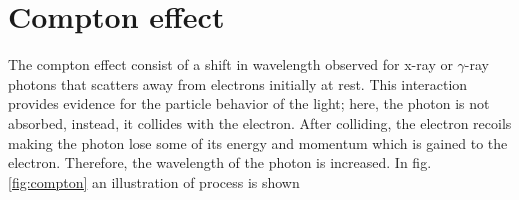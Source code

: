 \documentclass{article}
\begin{document}
\section{Compton effect}
The compton effect consist of a shift in wavelength observed for x-ray or $\gamma$-ray photons that scatters away from electrons initially at rest. This interaction provides evidence for the particle behavior of the light; here, the photon is not absorbed, instead, it collides with the electron. After colliding, the electron recoils making the photon lose some of its energy and momentum which is gained to the electron. Therefore, the wavelength of the photon is increased. In fig. \ref{fig:compton} an illustration of process is shown
\begin{marginfigure}%
\end{marginfigure}
\end{document}

